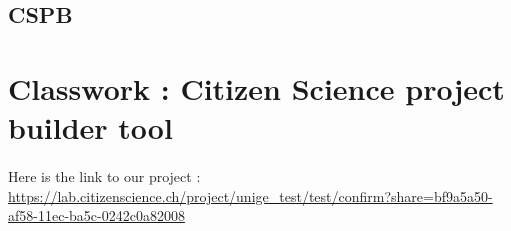 \documentclass[14pt]
{article}
\begin{document}
\pagestyle{fancy}

\bigskip
\begin{center}
	\section*{\textbf{{\LARGE CSPB}}}
\end{center}
\bigskip\bigskip\bigskip

\section*{Classwork : Citizen Science project builder tool }
\paragraph*{} Here is the link to our project : \href{https://lab.citizenscience.ch/project/unige\_test/test/confirm?share=bf9a5a50-af58-11ec-ba5c-0242c0a82008}{https://lab.citizenscience.ch/project/unige\_test/test/confirm?share=bf9a5a50-af58-11ec-ba5c-0242c0a82008}
\end{document}
